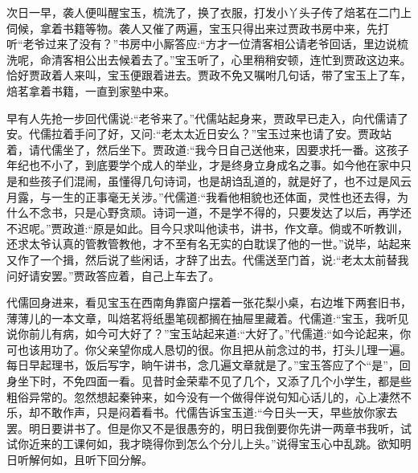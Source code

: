 \begin{parag}
    次日一早，袭人便叫醒宝玉，梳洗了，换了衣服，打发小丫头子传了焙茗在二门上伺候，拿着书籍等物。袭人又催了两遍，宝玉只得出来过贾政书房中来，先打听“老爷过来了没有？”书房中小厮答应:“方才一位清客相公请老爷回话，里边说梳洗呢，命清客相公出去候着去了。”宝玉听了，心里稍稍安顿，连忙到贾政这边来。恰好贾政着人来叫，宝玉便跟着进去。贾政不免又嘱咐几句话，带了宝玉上了车，焙茗拿着书籍，一直到家塾中来。
\end{parag}


\begin{parag}
    早有人先抢一步回代儒说:“老爷来了。”代儒站起身来，贾政早已走入，向代儒请了安。代儒拉着手问了好，又问:“老太太近日安么？”宝玉过来也请了安。贾政站着，请代儒坐了，然后坐下。贾政道:“我今日自己送他来，因要求托一番。这孩子年纪也不小了，到底要学个成人的举业，才是终身立身成名之事。如今他在家中只是和些孩子们混闹，虽懂得几句诗词，也是胡诌乱道的，就是好了，也不过是风云月露，与一生的正事毫无关涉。”代儒道:“我看他相貌也还体面，灵性也还去得，为什么不念书，只是心野贪顽。诗词一道，不是学不得的，只要发达了以后，再学还不迟呢。”贾政道:“原是如此。目今只求叫他读书，讲书，作文章。倘或不听教训，还求太爷认真的管教管教他，才不至有名无实的白耽误了他的一世。”说毕，站起来又作了一个揖，然后说了些闲话，才辞了出去。代儒送至门首，说:“老太太前替我问好请安罢。”贾政答应着，自己上车去了。
\end{parag}


\begin{parag}
    代儒回身进来，看见宝玉在西南角靠窗户摆着一张花梨小桌，右边堆下两套旧书，薄薄儿的一本文章，叫焙茗将纸墨笔砚都搁在抽屉里藏着。代儒道:“宝玉，我听见说你前儿有病，如今可大好了？”宝玉站起来道:“大好了。”代儒道:“如今论起来，你可也该用功了。你父亲望你成人恳切的很。你且把从前念过的书，打头儿理一遍。每日早起理书，饭后写字，晌午讲书，念几遍文章就是了。”宝玉答应了个“是”，回身坐下时，不免四面一看。见昔时金荣辈不见了几个，又添了几个小学生，都是些粗俗异常的。忽然想起秦钟来，如今没有一个做得伴说句知心话儿的，心上凄然不乐，却不敢作声，只是闷着看书。代儒告诉宝玉道:“今日头一天，早些放你家去罢。明日要讲书了。但是你又不是很愚夯的，明日我倒要你先讲一两章书我听，试试你近来的工课何如，我才晓得你到怎么个分儿上头。”说得宝玉心中乱跳。欲知明日听解何如，且听下回分解。
\end{parag}